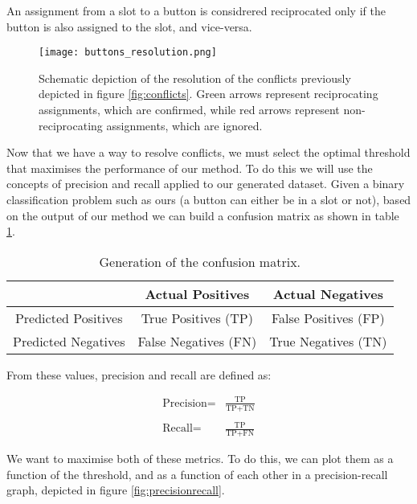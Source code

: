 An assignment from a slot to a button is considrered reciprocated only if the button is also assigned to the slot, and vice-versa.

\begin{figure}[ht]
    \texttt{[image: buttons\_resolution.png]}
    \caption{Schematic depiction of the resolution of the conflicts previously depicted in figure \ref{fig:conflicts}. Green arrows represent reciprocating assignments, which are confirmed, while red arrows represent non-reciprocating assignments, which are ignored.}
    \label{fig:resolution}
\end{figure}

Now that we have a way to resolve conflicts, we must select the optimal threshold that maximises the performance of our method. To do this we will use the concepts of precision and recall applied to our generated dataset. Given a binary classification problem such as ours (a button can either be in a slot or not), based on the output of our method we can build a confusion matrix as shown in table \ref{tab:cmatrix}.

\begin{table}[ht]
    \begin{center}
        \begin{tabular}{c||c|c}
            \space & Actual Positives & Actual Negatives\\
            \hline\hline
            Predicted Positives & True Positives (TP)& False Positives (FP)\\
            \hline
            Predicted Negatives & False Negatives (FN)& True Negatives (TN)\\
        \end{tabular}
        \caption{Generation of the confusion matrix.}
        \label{tab:cmatrix}
    \end{center}
\end{table}

From these values, precision and recall are defined as:

\begin{align*}
    \text{Precision} =& \frac{\text{TP}}{\text{TP}+\text{TN}} \\
    & \\
    \text{Recall} =& \frac{\text{TP}}{\text{TP}+\text{FN}}
\end{align*}

We want to maximise both of these metrics. To do this, we can plot them as a function of the threshold, and as a function of each other in a precision-recall graph, depicted in figure \ref{fig:precisionrecall}.

